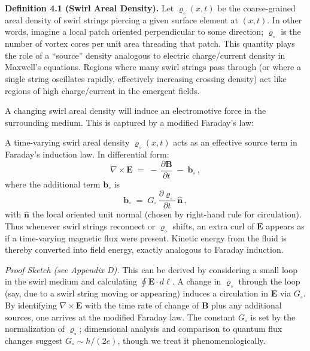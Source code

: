 \documentclass[reprint,aps,onecolumn,nofootinbib]{revtex4-2}
\begin{document}
	\textbf{Definition 4.1 (Swirl Areal Density).} Let $\varrho_{\circ}(x,t)$ be the coarse-grained areal density of swirl strings piercing a given surface element at $(x,t)$. In other words, imagine a local patch oriented perpendicular to some direction; $\varrho_{\circ}$ is the number of vortex cores per unit area threading that patch. This quantity plays the role of a “source” density analogous to electric charge/current density in Maxwell’s equations. Regions where many swirl strings pass through (or where a single string oscillates rapidly, effectively increasing crossing density) act like regions of high charge/current in the emergent fields.

	A changing swirl areal density will induce an electromotive force in the surrounding medium. This is captured by a modified Faraday’s law:

	\begin{tcolorbox}[title=Theorem 4.1: Swirl-Induced Electromotive Force]
		A time-varying swirl areal density $\varrho_{\circ}(x,t)$ acts as an effective source term in Faraday’s induction law. In differential form:
		\[
			\nabla \times \mathbf{E} \;=\; -\,\frac{\partial \mathbf{B}}{\partial t}\;-\; \mathbf{b}_{\circ}\,,
		\]
		where the additional term $\mathbf{b}_{\circ}$ is
		\[
			\mathbf{b}_{\circ} \;=\; G_{\circ}\,\frac{\partial \varrho_{\circ}}{\partial t}\,\hat{\mathbf{n}}\,,
		\]
		with $\hat{\mathbf{n}}$ the local oriented unit normal (chosen by right-hand rule for circulation). Thus whenever swirl strings reconnect or $\varrho_{\circ}$ shifts, an extra curl of $\mathbf{E}$ appears as if a time-varying magnetic flux were present. Kinetic energy from the fluid is thereby converted into field energy, exactly analogous to Faraday induction.
	\end{tcolorbox}

	\noindent \textit{Proof Sketch (see Appendix D).} This can be derived by considering a small loop in the swirl medium and calculating $\oint \mathbf{E}\cdot d\ell$. A change in $\varrho_{\circ}$ through the loop (say, due to a swirl string moving or appearing) induces a circulation in $\mathbf{E}$ via $G_{\circ}$. By identifying $\nabla \times \mathbf{E}$ with the time rate of change of $\mathbf{B}$ plus any additional sources, one arrives at the modified Faraday law. The constant $G_{\circ}$ is set by the normalization of $\varrho_{\circ}$; dimensional analysis and comparison to quantum flux changes suggest $G_{\circ}\sim h/(2e)$, though we treat it phenomenologically.
\end{document}

